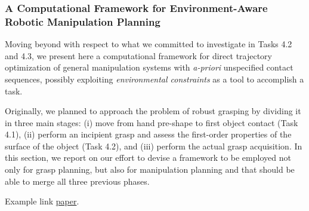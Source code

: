 
\subsubsection{A Computational Framework for Environment-Aware Robotic Manipulation Planning}

Moving beyond with respect to what we committed to investigate in Tasks 4.2 and 4.3, we present here a computational framework for direct trajectory optimization of general manipulation systems with \textsl{a-priori} unspecified contact sequences, possibly exploiting \emph{environmental constraints} as a tool to accomplish a task.
 
 Originally, we planned to approach the problem of robust grasping by dividing it in three main stages: (i) move from hand pre-shape to first object contact (Task 4.1), (ii) perform an incipient grasp and assess the first-order properties of the surface of the object (Task 4.2), and (iii) perform the actual grasp acquisition. In this section, we report on our effort to devise a framework to be employed not only for grasp planning, but also for manipulation planning and that should be able to merge all three previous phases. 

Example link \href{./attachedPapers/ComputationalFrameworkEnvAwareRobManipPlanning.pdf}{paper}. 